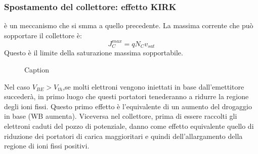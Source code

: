 \subsubsection{Spostamento del collettore: effetto KIRK}
è un meccanismo che si smma a quello precedente.
La massima corrente che può sopportare il collettore è:
\begin{equation}
    J_C^{max}=qN_Cv_{sat}
\end{equation}
Questo è il limite della saturazione massima sopportabile.
\begin{figure}[hbt!]
    \centering
    \caption{Caption}
    \label{fig:enter-label}
\end{figure}
%
Nel caso $V_{BE}>V_{th}$,se molti elettroni vengono iniettati in base dall'emettitore succederà, in primo luogo che questi portatori tenederanno a ridurre la regione degli ioni fissi. Questo primo effetto è l'equivalente di un aumento del drogaggio in base (WB aumenta).
Viceversa nel collettore, prima di essere raccolti gli elettroni caduti del pozzo di potenziale, danno come effetto equivalente quello di riduzione dei portatori di carica maggioritari e quindi dell'allargamento della regione di ioni fissi positivi.
